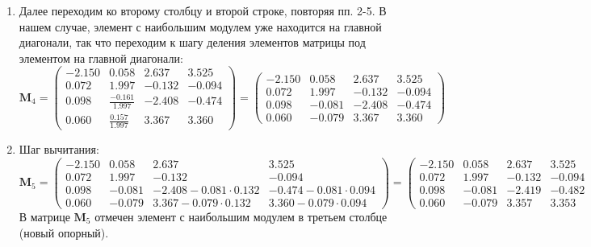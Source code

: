 \begin{enumerate}
    \item Далее переходим ко второму столбцу и второй строке, повторяя пп. 2-5. В нашем случае, элемент с наибольшим модулем уже находится на главной диагонали, так что переходим к шагу деления элементов матрицы под элементом на главной диагонали:
    \[\mathbf{M}_4 =
    \begin{pmatrix}
        -2.150&  0.058&  2.637&  3.525\\
        0.072&  \mathbf{1.997}& -0.132& -0.094\\
        0.098& \frac{-0.161}{1.997}& -2.408& -0.474\\
        0.060& \frac{ 0.157}{1.997}&  3.367&  3.360
    \end{pmatrix}=
    \begin{pmatrix}
       -2.150&          0.058 &  2.637&  3.525\\
        0.072& \mathbf{ 1.997}& -0.132& -0.094\\
        0.098& \mathit{-0.081}& -2.408& -0.474\\
        0.060& \mathit{-0.079}&  3.367&  3.360
    \end{pmatrix}\]

    \item Шаг вычитания:
    \[\mathbf{M}_5 =
     \begin{pmatrix}
       -2.150&          0.058 &  2.637&  3.525\\
        0.072&          1.997 & \mathbf{-0.132}& \mathbf{-0.094}\\
        0.098& \mathit{-0.081}& -2.408-0.081\cdot0.132& -0.474-0.081\cdot0.094\\
        0.060& \mathit{-0.079}&  3.367-0.079\cdot0.132&  3.360-0.079\cdot0.094
    \end{pmatrix} =
    \begin{pmatrix}
       -2.150&  0.058&  2.637&  3.525\\
        0.072&  1.997& -0.132& -0.094\\
        0.098& -0.081& -2.419& -0.482\\
        0.060& -0.079&  \mathbf{3.357}&  3.353
    \end{pmatrix}\]
    В матрице $\mathbf{M}_5$ отмечен элемент с наибольшим модулем в третьем столбце (новый опорный).


\end{enumerate}
